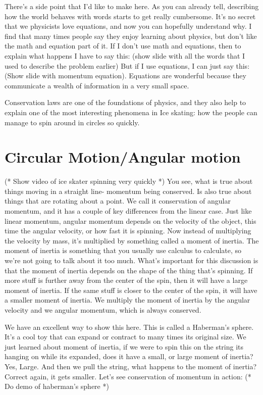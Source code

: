\documentclass[12pt]{article}
\begin{document}
There's a side point that I'd like to make here.
As you can already tell, describing how the world behaves with words starts to get 
really cumbersome. It's no secret that we physicists love equations, and now you
can hopefully understand why. I find that many times people say they enjoy learning
about physics, but don't like the math and equation part of it. If I don't use
math and equations, then to explain what happens I have to say this:
(show slide with all the words that I used to 
describe the problem earlier)
But if I use equations, I can just say this:
(Show slide with momentum equation). 
Equations are wonderful because they communicate a wealth of information in a very 
small space. 

Conservation laws are one of the foundations of physics, and they also help to explain
one of the most interesting phenomena in Ice skating: how the people can manage to 
spin around in circles so quickly. 

\section{Circular Motion/Angular motion}
(* Show video of ice skater spinning very quickly *)
You see, what is true about things moving in a straight line- momentum being conserved. Is also 
true about things that are rotating about a point. We call it conservation of angular momentum,
and it has a couple of key differences from the linear case. Just like linear momentum, 
angular momentum depends on the velocity of the object, this time the angular velocity,
or how fast it is spinning. Now instead of multiplying the velocity by mass, it's
multiplied by something called a moment of inertia. The moment of inertia is something
that you usually use calculus to calculate, so we're not going to talk about it too much.
What's important for this discussion is that the moment of inertia depends on the shape
of the thing that's spinning. If more stuff is further away from the center of the spin, 
then it will have a large moment of inertia. If the same stuff is closer to the center
of the spin, it will have a smaller moment of inertia. We multiply the moment of inertia
by the angular velocity and we angular momentum, which is always conserved. 

We have an excellent way to show
this here. This is called a Haberman's sphere. It's a cool toy that can expand or contract
to many times its original size. We just learned about moment of inertia, if we were to spin 
this on the string its hanging on while its expanded, does it have a small, or large moment
of inertia? Yes, Large. And then we pull the string, what happens to the moment of inertia? 
Correct again, it gets smaller. Let's see conservation of momentum in action: 
(* Do demo of haberman's sphere *)
\end{document}
